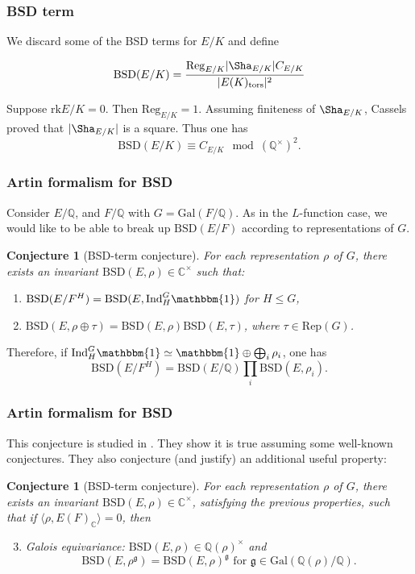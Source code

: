 \documentclass{beamer}
\newcommand{\Gal}{\mathrm{Gal}}
\newcommand{\BSD}{\mathrm{BSD}}
\newcommand{\tors}{\mathrm{tors}}
\newcommand{\Reg}{\mathrm{Reg}}
\newcommand{\rk}{\mathrm{rk}}
\newcommand{\trivial}{\mathbbm{1}}
\newcommand{\Ind}{\mathrm{Ind}}
\newcommand{\Rep}{\mathrm{Rep}}
\newcommand{\CC}{\mathbb{C}}
\newcommand{\QQ}{\mathbb{Q}}
\newcommand{\bQ}{\mathbb{Q}}
\theoremstyle{plain}
\newtheorem{conjecture}[thm]{Conjecture}
\begin{document}
\begin{frame}
    \frametitle{BSD term}
    We discard some of the BSD terms for $E / K$
    and define  

    \begin{definition}
        $$\BSD(E / K) = \frac{\Reg_{E / K}|\Sha_{E / K}| C_{E / K}}{|E(K)_{\tors}|^2 }$$
    \end{definition}
    \pause

    Suppose $\rk E / K = 0$. Then $\Reg_{E / K} = 1$. Assuming finiteness of $\Sha_{E / K}$, Cassels proved that $|\Sha_{E / K}|$ is a square. \pause Thus one has
    $$ \BSD(E / K) \equiv C_{E / K} \mod (\QQ^{\times})^2. $$
\end{frame}

\begin{frame}
    \frametitle{Artin formalism for BSD}
    Consider $E / \QQ$, and $F / \QQ$ with $G = \Gal(F / \QQ)$.  \pause
    As in the $L$-function case, we would like to be able to break up $\BSD(E / F)$ according to representations of $G$. \pause
    
    \begin{conjecture}[BSD-term conjecture]
        For each representation $\rho$ of $G$, there exists an invariant $\BSD(E, \rho) \in \CC^{\times}$ such that:\pause
        \begin{enumerate}
            \item$\BSD(E / F^H) = \BSD(E, \Ind_H^G \trivial)$ for $H \leq G$, \pause
            \item $\BSD(E, \rho \oplus \tau) = \BSD(E, \rho)\BSD(E , \tau)$, where $\tau \in \Rep(G)$.\pause
        \end{enumerate}
    \end{conjecture}

    Therefore, if $\Ind_H^G \trivial \simeq \trivial \oplus \bigoplus_i \rho_i$, one has
    $$ \BSD(E / F^H) = \BSD(E / \QQ)\prod_i \BSD(E, \rho_i). $$ 
\end{frame}

\begin{frame}
    \frametitle{Artin formalism for BSD}
This conjecture is studied in \cite{DEW1}. They show it is true assuming some well-known conjectures. \pause They also conjecture (and justify) an additional useful property: 

\begin{conjecture}[BSD-term conjecture]
    For each representation $\rho$ of $G$, there exists an invariant $\BSD(E, \rho) \in \CC^{\times}$, satisfying the previous properties, \pause such that if $\langle \rho, E(F)_{\CC} \rangle = 0$, then
    \begin{enumerate}\setcounter{enumi}{2}
        \item Galois equivariance: $\BSD(E, \rho) \in \QQ(\rho)^{\times}$ and $$\BSD(E, \rho^{\mathfrak{g}}) = \BSD(E, \rho)^{\mathfrak{g}} \text{ for } \mathfrak{g} \in \Gal(\bQ(\rho) / \bQ).$$ 
    \end{enumerate}

\end{conjecture}
\end{frame}
\end{document}

